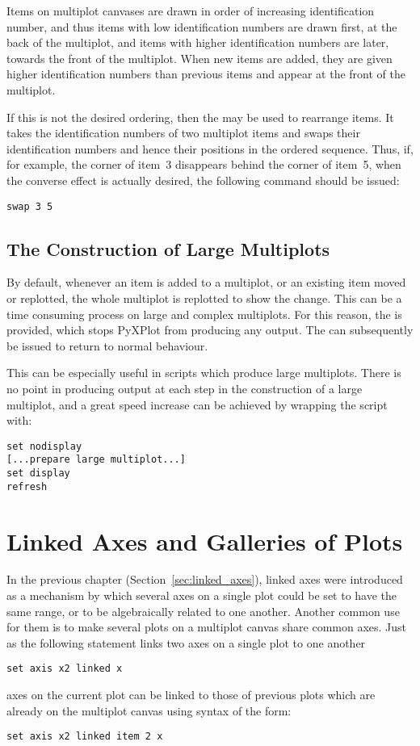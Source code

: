 Items on multiplot canvases are drawn in order of increasing identification
number, and thus items with low identification numbers are drawn first, at the
back of the multiplot, and items with higher identification numbers are later,
towards the front of the multiplot. When new items are added, they are given
higher identification numbers than previous items and appear at the front of
the multiplot.

If this is not the desired ordering, then the  may be used to
rearrange items. It takes the identification numbers of two multiplot items and
swaps their identification numbers and hence their positions in the ordered
sequence.  Thus, if, for example, the corner of item~3 disappears behind the
corner of item~5, when the converse effect is actually desired, the following
command should be issued:
\begin{verbatim}
swap 3 5
\end{verbatim}

\subsection{The Construction of Large Multiplots}
\label{sec:set_display}

By default, whenever an item is added to a multiplot, or an existing item moved
or replotted, the whole multiplot is replotted to show the change. This can be
a time consuming process on large and complex multiplots. For this reason, the
 is provided, which stops PyXPlot from producing any
output. The  can subsequently be issued to return to
normal behaviour.

This can be especially useful in scripts which produce large multiplots. There
is no point in producing output at each step in the construction of a large
multiplot, and a great speed increase can be achieved by wrapping the script
with:

\begin{verbatim}
set nodisplay
[...prepare large multiplot...]
set display
refresh
\end{verbatim}

\section{Linked Axes and Galleries of Plots}

In the previous chapter (Section~\ref{sec:linked_axes}), linked axes were
introduced as a mechanism by which several axes on a single plot could be set
to have the same range, or to be algebraically related to one another. Another
common use for them is to make several plots on a multiplot canvas share common
axes. Just as the following statement links two axes on a single plot to one
another
\begin{verbatim}
set axis x2 linked x
\end{verbatim}
axes on the current plot can be linked to those of previous plots which are
already on the multiplot canvas using syntax of the form:
\begin{verbatim}
set axis x2 linked item 2 x
\end{verbatim}

